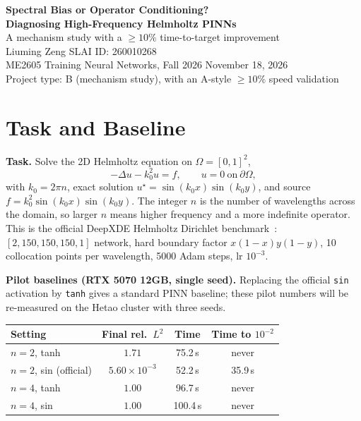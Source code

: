 \documentclass[10pt]{article}
\begin{document}
\sloppy

\begin{center}
{\large\bfseries Spectral Bias or Operator Conditioning?\\[1pt]
Diagnosing High-Frequency Helmholtz PINNs}\\[2pt]
{\normalsize A mechanism study with a $\ge10\%$ time-to-target improvement}\\[2pt]
{\small Liuming Zeng \quad SLAI ID: 260010268}\\[1pt]
{\small ME2605 Training Neural Networks, Fall 2026 \quad November 18, 2026}\\[1pt]
{\small Project type: B (mechanism study), with an A-style $\ge10\%$ speed validation}
\end{center}
\vspace{-6pt}

\section{Task and Baseline}

\textbf{Task.} Solve the 2D Helmholtz equation on $\Omega=[0,1]^2$,
\begin{equation}
-\Delta u-k_0^2u=f,\qquad u=0\ \text{on}\ \partial\Omega,
\label{eq:helmholtz}
\end{equation}
with $k_0=2\pi n$, exact solution $u^\star=\sin(k_0x)\sin(k_0y)$, and source $f=k_0^2\sin(k_0x)\sin(k_0y)$. The integer $n$ is the number of wavelengths across the domain, so larger $n$ means higher frequency and a more indefinite operator. This is the official DeepXDE Helmholtz Dirichlet benchmark~\cite{deepxde}: $[2,150,150,150,1]$ network, hard boundary factor $x(1-x)y(1-y)$, 10 collocation points per wavelength, 5000 Adam steps, lr $10^{-3}$.

\textbf{Pilot baselines (RTX 5070 12GB, single seed).} Replacing the official \texttt{sin} activation by \texttt{tanh} gives a standard PINN baseline; these pilot numbers will be re-measured on the Hetao cluster with three seeds.

\begin{center}
\vspace{-4pt}
\begin{tabular}{lccc}
\toprule
Setting & Final rel.\ $L^2$ & Time & Time to $10^{-2}$ \\
\midrule
$n=2$, tanh & $1.71$ & 75.2\,s & never \\
$n=2$, sin (official) & $5.60\times10^{-3}$ & 52.2\,s & 35.9\,s \\
$n=4$, tanh & $1.00$ & 96.7\,s & never \\
$n=4$, sin & $1.00$ & 100.4\,s & never \\
\bottomrule
\end{tabular}
\vspace{-2pt}
\end{center}
\end{document}
